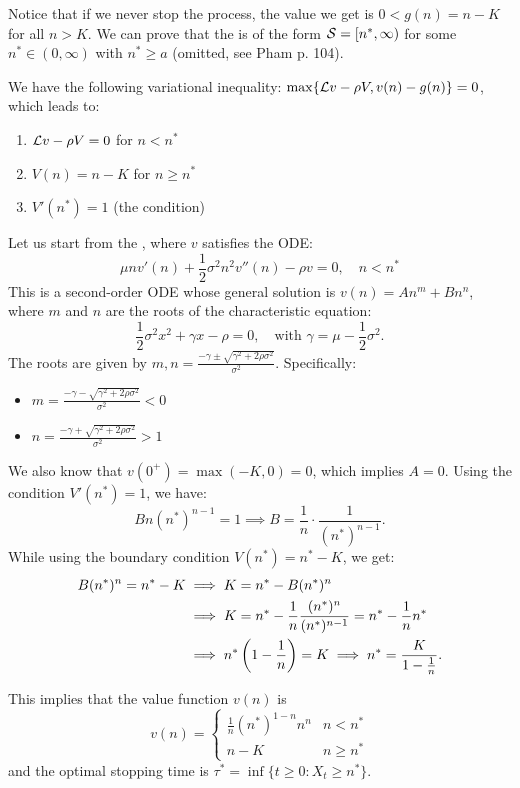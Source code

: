 \begin{remark}
\begin{enumerate}[label=(\roman*)]
        Notice that if we never stop the process, the value we get is $0 < g(n) = n - K$ for all $n > K$. We can prove that the  is of the form $\mathcal{S} = [n^*, \infty)$ for some $n^* \in (0, \infty)$ with $n^* \geq a$ (omitted, see Pham p. 104).
        
        We have the following variational inequality: $\max \{ \mathcal{L}v - \rho V, v(n) - g(n) \} = 0$, which leads to:
        \begin{enumerate}[label=\arabic*.]
            \item $\mathcal{L}v - \rho V = 0$ for $n < n^*$
            \item $V(n) = n - K$ for $n \geq n^*$
            \item $V'(n^*) = 1$ (the  condition)
        \end{enumerate}
        
        Let us start from the , where $v$ satisfies the ODE:
        \[ \mu n v'(n) + \frac{1}{2} \sigma^2 n^2 v''(n) - \rho v = 0, \quad n < n^* \]
        This is a second-order ODE whose general solution is $v(n) = A n^m + B n^n$, where $m$ and $n$ are the roots of the characteristic equation:
        \[ \frac{1}{2} \sigma^2 x^2 + \gamma x - \rho = 0, \quad \text{with } \gamma = \mu - \frac{1}{2} \sigma^2. \]
        The roots are given by $m, n = \frac{-\gamma \pm \sqrt{\gamma^2 + 2 \rho \sigma^2}}{\sigma^2}$. Specifically:
        \begin{itemize}
            \item $m = \frac{-\gamma - \sqrt{\gamma^2 + 2 \rho \sigma^2}}{\sigma^2} < 0$
            \item $n = \frac{-\gamma + \sqrt{\gamma^2 + 2 \rho \sigma^2}}{\sigma^2} > 1$
        \end{itemize}
        We also know that $v(0^+) = \max(-K, 0) = 0$, which implies $A = 0$. Using the  condition $V'(n^*) = 1$, we have:
        \[ B n (n^*)^{n-1} = 1 \implies B = \frac{1}{n} \cdot \frac{1}{(n^*)^{n-1}}. \]
        While using the boundary condition $V(n^*) = n^* - K$, we get:
        \begin{align*}
            B (n^*)^n = n^* - K &\implies K = n^* - B (n^*)^n \\
            &\implies K = n^* - \frac{1}{n} \frac{(n^*)^n}{(n^*)^{n-1}} = n^* - \frac{1}{n} n^* \\
            &\implies n^* \left(1 - \frac{1}{n}\right) = K \implies n^* = \frac{K}{1 - \frac{1}{n}}.
        \end{align*}
    \end{enumerate}
\end{remark}

\begin{remark}
    This implies that the value function $v(n)$ is
    \[ v(n) = \begin{cases} \frac{1}{n} (n^*)^{1-n} n^n & n < n^* \\ n - K & n \geq n^* \end{cases} \]
    and the optimal stopping time is $\tau^* = \inf \{ t \geq 0 : X_t \geq n^* \}$.
\end{remark}